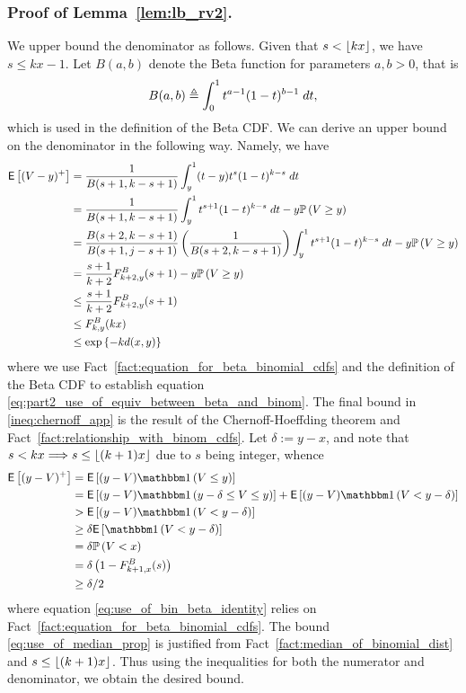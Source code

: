 \subsubsection{Proof of Lemma~\ref{lem:lb_rv2}.} \label{prf:proof_of_lb_rv2}
\begin{myproof}[Proof.]
	We upper bound the denominator as follows. Given that $s < \lfloor k x\rfloor$, we have $s \le kx - 1$. Let $B(a,b)$ denote the Beta function for parameters $a, b > 0$, that is
	\[
	B(a, b) \triangleq \int_0^1 t^{a-1}(1-t)^{b-1} \;dt,
	\]
	which is used in the definition of the Beta CDF. We can derive an upper bound on the denominator in the following way. Namely, we have
	\begin{align}
	\mathsf{E} \left[ (V - y)^+  \right] & = \frac{1}{B(s+1,k-s+1)}\int_{y}^1 (t-y) t^s (1-t)^{k-s} \; dt \nonumber \\
	& = \frac{1}{B(s+1,k-s+1)}\int_{y}^1 t^{s+1} (1-t)^{k-s} \; dt - y \mathbb{P} \left( V \ge y \right) \nonumber \\
	& = \frac{B(s+2,k-s+1)}{B(s+1,j-s+1)}\left( \frac{1}{B(s+2,k-s+1)} \right)\int_{y}^1 t^{s+1} (1-t)^{k-s}\; dt - y \mathbb{P} \left( V \ge y \right) \nonumber \\
	& = \frac{s+1}{k+2} F^B_{k+2,y}(s+1)  - y \mathbb{P} \left( V \ge y \right) \label{eq:part2_use_of_equiv_between_beta_and_binom} \\
	& \le \frac{s+1}{k+2} F^B_{k+2,y}(s+1) \nonumber \\
	& \le  F^B_{k,y}(k x)  \nonumber \\
	& \le \exp\left\{- k d(x,y) \label{ineq:chernoff_app} \right\}
	\end{align}
	where we use Fact~\ref{fact:equation_for_beta_binomial_cdfs} and the definition of the Beta CDF to establish equation \eqref{eq:part2_use_of_equiv_between_beta_and_binom}. The final bound in \eqref{ineq:chernoff_app} is the result of the Chernoff-Hoeffding theorem and Fact~\ref{fact:relationship_with_binom_cdfs}. Let $\delta:=y-x$, and note that $s < kx \Longrightarrow s \le \lfloor(k+1)x\rfloor$ due to $s$ being integer, whence
	\begin{align}
	\Ee{(y - V)^+ } & =  \Ee{(y - V) \ind{V \le y}} \nonumber \\
	& = \Ee{(y - V) \ind{y - \delta \le V \le y} } +  \Ee{(y - V) \ind{V < y - \delta} } \nonumber\\
	& > \Ee{(y - V) \ind{V < y - \delta} }\nonumber \\
	& \ge \delta\Ee{\ind{V < y-\delta} }\\
	& = \delta \P{V < x } \nonumber \\
	& = \delta\left(1 - F^B_{k+1,x}(s) \right) \label{eq:use_of_bin_beta_identity}  \\
	& \ge \delta/2  \label{eq:use_of_median_prop}
	\end{align}
	where equation \eqref{eq:use_of_bin_beta_identity} relies on Fact~\ref{fact:equation_for_beta_binomial_cdfs}. The bound \eqref{eq:use_of_median_prop} is justified from Fact~\ref{fact:median_of_binomial_dist} and $s \le \lfloor(k+1) x\rfloor$. Thus using the inequalities for both the numerator and denominator, we obtain the desired bound.
\end{myproof}
